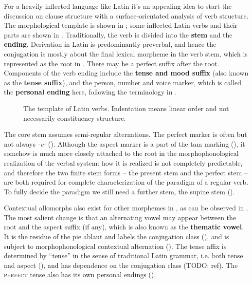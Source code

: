 \documentclass[a4paper, oneside, 12pt]{report}
\newcommand*{\citesec}[1]{\S~{#1}}
\newcommand*{\citepage}[1]{p.~{#1}}
\newcommand*{\concept}[1]{\textbf{#1}}
\newcommand{\form}[1]{\emph{#1}}
\newcommand*{\category}[1]{\textsc{#1}}
\begin{document}
For a heavily inflected language like Latin
it's an appealing idea 
to start the discussion on clause structure 
with a surface-orientated analysis of verb structure.
The morphological template is shown in ; 
some inflected Latin verbs and their parts are shown in .
Traditionally, the verb is divided 
into the \concept{stem} and the \concept{ending}.
Derivation in Latin is predominantly preverbal,
and hence the conjugation is mostly about the final lexical morpheme in the verb stem,
which is represented as the root in .
There may be a perfect suffix after the root.
Components of the verb ending include 
the \concept{tense and mood suffix} (also known as the \concept{tense suffix}),
and the person, number and voice marker,
which is called the \concept{personal ending} here, 
following the terminology in \citet[\citesec{165}]{allen1903allen}.

\begin{figure}[H]
    \centering
    
    \caption{The template of Latin verbs.
    Indentation means linear order and not necessarily constituency structure.}
    \label{fig:latin-verb}
\end{figure}

The core stem assumes semi-regular alternations.
The perfect marker is often but not always \form{-v-} ().
Although the aspect marker is a part of the \acs{tam} marking
(),
it somehow is much more closely attached to the root 
in the morphophonological realization of the verbal system:
how it is realized is not completely predictable,
and therefore the two finite stem forms -- 
the present stem and the perfect stem -- 
are both required for complete characterization of the paradigm of a regular verb.
To fully decide the paradigm 
we still need a further stem, the supine stem
().

Contextual allomorphs also exist for other morphemes in 
\citep[\citepage{11}]{embick2005status},
as can be observed in .
The most salient change is that 
an alternating vowel may appear between the root and the aspect suffix (if any),
which is also known as the \concept{thematic vowel}.
It is the residue of the \ac{pie} ablaut
and labels the conjugation class
(),
and is subject to morphophonological contextual alternation
().
The tense affix is determined by ``tense'' in the sense of traditional Latin grammar, 
i.e. both tense and aspect (),
and has dependence on the conjugation class (TODO: ref).
The \category{perfect} tense also has its own personal endings ().
\end{document}
